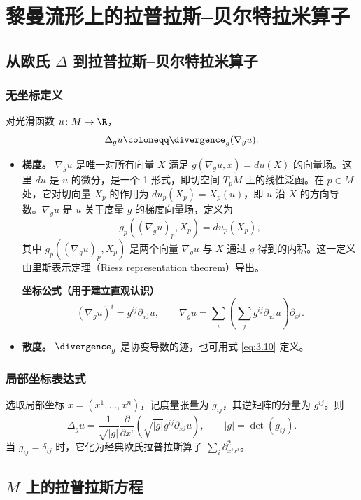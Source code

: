\section{黎曼流形上的拉普拉斯–贝尔特拉米算子}
\label{sec:3.10}
\subsection{从欧氏 \texorpdfstring{$\Delta$}{Δ} 到拉普拉斯–贝尔特拉米算子}
\subsubsection{无坐标定义}
对光滑函数 $u\colon M\to\R$，
\[
  \Delta_gu\coloneqq\divergence_g(\nabla_gu).
\]
\begin{itemize}
\item \textbf{梯度。} $\nabla_g u$ 是唯一对所有向量 $X$ 满足 $g(\nabla_gu,x)=du(X)$ 的向量场。这里 $du$ 是 $u$ 的微分，是一个 1-形式，即切空间 $T_pM$ 上的线性泛函。在 $p\in M$ 处，它对切向量 $X_p$ 的作用为 $du_p(X_p)=X_p(u)$，即 $u$ 沿 $X$ 的方向导数。$\nabla_g u$ 是 $u$ 关于度量 $g$ 的梯度向量场，定义为
\[
  g_p((\nabla_g u)_p,X_p)=du_p(X_p),
\]
其中 $g_p((\nabla_g u)_p,X_p)$ 是两个向量 $\nabla_g u$ 与 $X$ 通过 $g$ 得到的内积。这一定义由里斯表示定理（Riesz representation theorem）导出。

\textbf{坐标公式（用于建立直观认识）}
\begin{equation*}
  (\nabla_gu)^i=g^{ij}\partial_{x^j}u,\qquad
  \nabla_gu=\sum_i\left(\sum_jg^{ij}\partial_{x^j}u\right)\partial_{x^i}.
  \tag{3.13}\label{eq:3.13}
\end{equation*}
\item \textbf{散度。} $\divergence_g$ 是协变导数的迹，也可用式 \eqref{eq:3.10} 定义。
\end{itemize}

\subsubsection{局部坐标表达式}
选取局部坐标 $x=(x^1,\dots,x^n)$，记度量张量为 $g_{ij}$，其逆矩阵的分量为 $g^{ij}$。则
\begin{equation*}
  \Delta_gu=\frac{1}{\sqrt{|g|}}\frac{\partial}{\partial x^i}
    \left(\sqrt{|g|}g^{ij}\partial_{x^j}u\right),\qquad
  |g|=\det(g_{ij}).
  \tag{3.14}\label{eq:3.14}
\end{equation*}
当 $g_{ij}=\delta_{ij}$ 时，它化为经典欧氏拉普拉斯算子 $\sum_i\partial^2_{x^ix^i}$。

\subsection{\texorpdfstring{$M$}{M} 上的拉普拉斯方程}
